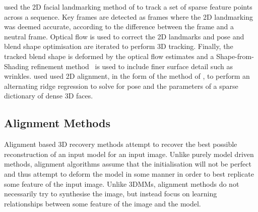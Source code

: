 \citet{Garrido:2013dia} used the 2D facial landmarking method of
\citet{saragih2011deformable} to track a set of sparse feature points across
a sequence. Key frames are detected as frames where the 2D landmarking was
deemed accurate, according to the difference between the frame and a neutral
frame. Optical flow is used to correct the 2D landmarks and pose and blend shape
optimisation are iterated to perform 3D tracking. Finally, the tracked
blend shape is deformed by the optical flow estimates and a Shape-from-Shading
refinement method~\cite{valgaerts2012lightweight} is used to include finer
surface detail such as wrinkles. \citet{ferrari2015dictionary} used used
2D alignment, in the form of the method of
\citet{xiong2013supervised}, to perform
an alternating ridge regression to solve for pose and the parameters of a sparse
dictionary of dense 3D faces.
\subsection{Alignment Methods}\label{subsec:bg_model_based_alignment}
Alignment based 3D recovery methods attempt to recover the best possible
reconstruction of an input model for an input image. Unlike purely model
driven methods, alignment algorithms assume that the initialisation will not be
perfect and thus attempt to deform the model in some manner in order to best
replicate some feature of the input image. Unlike 3DMMs, alignment methods
do not necessarily try to synthesise the image, but instead focus on learning
relationships between some feature of the image and the model.

